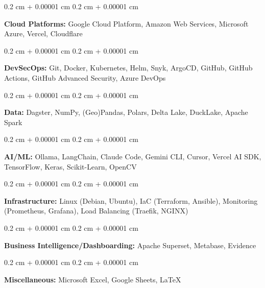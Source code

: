 \documentclass[10pt, a4paper]{article}
\newenvironment{onecolentry}{
    \begin{adjustwidth}{
        0.2 cm + 0.00001 cm
    }{
        0.2 cm + 0.00001 cm
    }
}{
    \end{adjustwidth}
} %
\begin{document}
        \vspace{0.2 cm}

        \begin{onecolentry}
            \textbf{Cloud Platforms:} Google Cloud Platform, Amazon Web Services, Microsoft Azure, Vercel, Cloudflare

        \end{onecolentry}

        \vspace{0.2 cm}

        \begin{onecolentry}
            \textbf{DevSecOps:} Git, Docker, Kubernetes, Helm, Snyk, ArgoCD, GitHub, GitHub Actions, GitHub Advanced Security, Azure DevOps

        \end{onecolentry}

        \vspace{0.2 cm}

        \begin{onecolentry}
            \textbf{Data:} Dagster, NumPy, (Geo)Pandas, Polars, Delta Lake, DuckLake, Apache Spark
        \end{onecolentry}

        \vspace{0.2 cm}

        \begin{onecolentry}
            \textbf{AI/ML:} Ollama, LangChain, Claude Code, Gemini CLI, Cursor, Vercel AI SDK, TensorFlow, Keras, Scikit-Learn, OpenCV

        \end{onecolentry}

        \vspace{0.2 cm}

        \begin{onecolentry}
            \textbf{Infrastructure:} Linux (Debian, Ubuntu), IaC (Terraform, Ansible), Monitoring (Prometheus, Grafana),  Load Balancing (Traefik, NGINX)

        \end{onecolentry}

        \vspace{0.2 cm}

        \begin{onecolentry}
            \textbf{Business Intelligence/Dashboarding:} Apache Superset, Metabase, Evidence
        \end{onecolentry}

        \vspace{0.2 cm}

        \begin{onecolentry}
            \textbf{Miscellaneous:} Microsoft Excel, Google Sheets, LaTeX
        \end{onecolentry}


    
\end{document}
